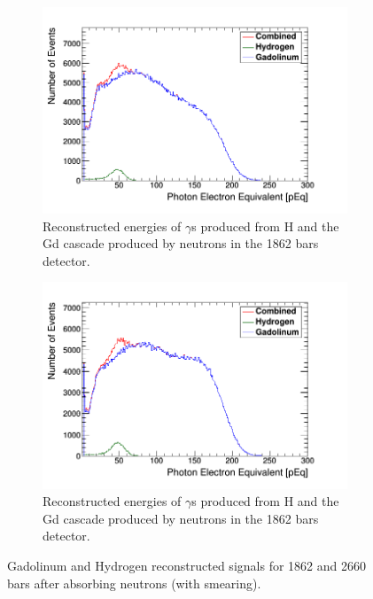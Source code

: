 \documentclass[12pt,a4paper]{article}
\begin{document}
\begin{figure}[H]
\centering
\begin{subfigure}{.5\textwidth}
  \centering
  \includegraphics[width=\linewidth]{neutron_2000_bars_Gd_H_PEQ.png}
  \captionsetup{width=0.9\linewidth}
  \caption{Reconstructed energies of $\gamma$s produced from H and the Gd cascade produced by neutrons in the 1862 bars detector.}
  \label{sub_2000_gd_h_peq}
\end{subfigure}%
\begin{subfigure}{.5\textwidth}
  \centering
  \includegraphics[width=\linewidth]{neutron_3000_bars_Gd_H_PEQ.png}
  \captionsetup{width=.9\linewidth}
  \caption{Reconstructed energies of $\gamma$s produced from H and the Gd cascade produced by neutrons in the 1862 bars detector.}
  \label{sub_3000_gd_h_peq}
\end{subfigure}
\caption{Gadolinum and Hydrogen reconstructed signals for 1862 and 2660 bars after absorbing neutrons (with smearing).}
\label{2000_3000_gd_h_peq}
\end{figure}
\end{document}
